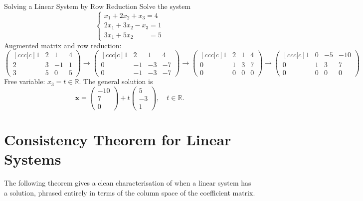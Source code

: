 \documentclass[12pt,a4paper]{article}
\newcommand{\R}{\mathbb{R}}
\newcommand{\vv}[1]{\mathbf{#1}}
\begin{document}
	\begin{exbox}{Solving a Linear System by Row Reduction}{}
		Solve the system
		\[
		\begin{cases}
			x_1 + 2x_2 + x_3 = 4\\
			2x_1 + 3x_2 - x_3 = 1\\
			3x_1 + 5x_2 \phantom{{}+x_3} = 5
		\end{cases}
		\]
		Augmented matrix and row reduction:
		\[
		\begin{pmatrix}[ccc|c]
			1 & 2 & 1 & 4\\
			2 & 3 & -1 & 1\\
			3 & 5 & 0 & 5
		\end{pmatrix}
		\rightarrow
		\begin{pmatrix}[ccc|c]
			1 & 2 & 1 & 4\\
			0 & -1 & -3 & -7\\
			0 & -1 & -3 & -7
		\end{pmatrix}
		\rightarrow
		\begin{pmatrix}[ccc|c]
			1 & 2 & 1 & 4\\
			0 & 1 & 3 & 7\\
			0 & 0 & 0 & 0
		\end{pmatrix}
		\rightarrow
		\begin{pmatrix}[ccc|c]
			1 & 0 & -5 & -10\\
			0 & 1 & 3 & 7\\
			0 & 0 & 0 & 0
		\end{pmatrix}
		\]
		Free variable: \(x_3 = t \in \R\). The general solution is
		\[
		\vv{x} =
		\begin{pmatrix}-10\\7\\0\end{pmatrix}
		+ t\begin{pmatrix}5\\-3\\1\end{pmatrix}, \quad t \in \R.
		\]
	\end{exbox}
	
	\section{Consistency Theorem for Linear Systems}
	
	The following theorem gives a clean characterisation of when a linear system has
	a solution, phrased entirely in terms of the column space of the coefficient matrix.
	
\end{document}
